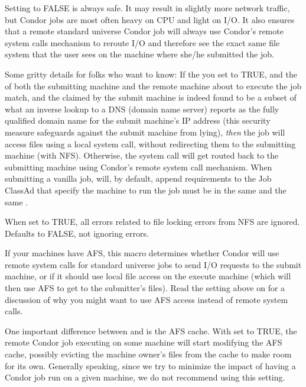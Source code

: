 \begin{description}
  Setting  to FALSE is always safe.  It may result
  in slightly more network traffic, but Condor jobs are most often heavy
  on CPU and light on I/O.  It also ensures that a remote
  standard universe Condor job will always use Condor's remote system
  calls mechanism to reroute I/O and therefore see the exact same
  file system that the user sees on the machine where she/he submitted
  the job.
  
  Some gritty details for folks who want to know: If the you set
   to TRUE, and the  of
  both the submitting machine and the remote machine about to execute
  the job match, and the  claimed by the
  submit machine is indeed found to be a subset of what an inverse
  lookup to a DNS (domain name server) reports as the fully qualified
  domain name for the submit machine's IP address (this security
  measure safeguards against the submit machine from lying),
  \emph{then} the job will access files using a local system call,
  without redirecting them to the submitting machine (with
  NFS).  Otherwise, the system call will get routed back to the
  submitting machine using Condor's remote system call mechanism.
  \Note When submitting a vanilla job,  will, by default,
  append requirements to the Job ClassAd that specify the machine to run
  the job must be in the same  and the same
  .

\item[\Macro{IGNORE\_NFS\_LOCK\_ERRORS}] \label{param:IgnoreNFSLockErrors}
  When set to TRUE, all errors related to file locking errors from
  NFS are ignored.
  Defaults to FALSE, not ignoring errors.
  
\item[\Macro{USE\_AFS}] \label{param:UseAfs} If your machines have AFS,
  this
  macro determines whether Condor will use remote system calls for
  standard universe jobs to send I/O requests to the submit machine,
  or if it should use local file access on the execute machine (which
  will then use AFS to get to the submitter's files).  Read the
  setting above on  for a discussion of why you might
  want to use AFS access instead of remote system calls.
  
  One important difference between  and
   is the AFS cache.  With  set to
  TRUE, the remote Condor job executing on some machine will start
  modifying the AFS cache, possibly evicting the machine owner's
  files from the cache to make room for its own.  Generally speaking,
  since we try to minimize the impact of having a Condor job run on a
  given machine, we do not recommend using this setting.


\end{description}
